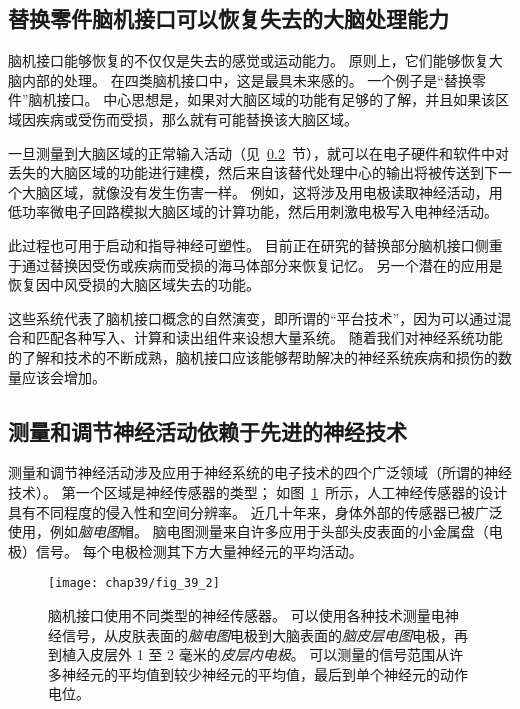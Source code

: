 \subsection{替换零件脑机接口可以恢复失去的大脑处理能力}

脑机接口能够恢复的不仅仅是失去的感觉或运动能力。
原则上，它们能够恢复大脑内部的处理。
在四类脑机接口中，这是最具未来感的。
一个例子是“替换零件”脑机接口。
中心思想是，如果对大脑区域的功能有足够的了解，并且如果该区域因疾病或受伤而受损，那么就有可能替换该大脑区域。


一旦测量到大脑区域的正常输入活动（见~\ref{sec:39_1_5}~节），就可以在电子硬件和软件中对丢失的大脑区域的功能进行建模，然后来自该替代处理中心的输出将被传送到下一个大脑区域，就像没有发生伤害一样。
例如，这将涉及用电极读取神经活动，用低功率微电子回路模拟大脑区域的计算功能，然后用刺激电极写入电神经活动。


此过程也可用于启动和指导神经可塑性。
目前正在研究的替换部分脑机接口侧重于通过替换因受伤或疾病而受损的海马体部分来恢复记忆。
另一个潜在的应用是恢复因中风受损的大脑区域失去的功能。


这些系统代表了脑机接口概念的自然演变，即所谓的“平台技术”，因为可以通过混合和匹配各种写入、计算和读出组件来设想大量系统。
随着我们对神经系统功能的了解和技术的不断成熟，脑机接口应该能够帮助解决的神经系统疾病和损伤的数量应该会增加。



\subsection{测量和调节神经活动依赖于先进的神经技术} \label{sec:39_1_5}

测量和调节神经活动涉及应用于神经系统的电子技术的四个广泛领域（所谓的神经技术）。
第一个区域是神经传感器的类型；
如图~\ref{fig:39_2}~所示，人工神经传感器的设计具有不同程度的侵入性和空间分辨率。
近几十年来，身体外部的传感器已被广泛使用，例如\textit{脑电图}帽。
脑电图测量来自许多应用于头部头皮表面的小金属盘（电极）信号。
每个电极检测其下方大量神经元的平均活动。


\begin{figure}[htbp]
	\centering
	\texttt{[image: chap39/fig\_39\_2]}
	\caption{脑机接口使用不同类型的神经传感器。 
		可以使用各种技术测量电神经信号，从皮肤表面的\textit{脑电图}电极到大脑表面的\textit{脑皮层电图}电极，再到植入皮层外 1 至 2 毫米的\textit{皮层内电极}。
		可以测量的信号范围从许多神经元的平均值到较少神经元的平均值，最后到单个神经元的动作电位\cite{blabe2015assessment}。}
	\label{fig:39_2}
\end{figure}


